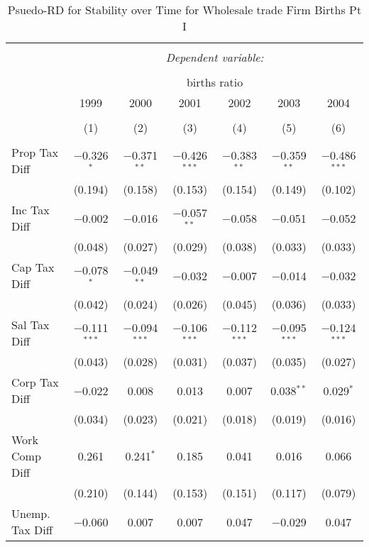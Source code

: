 
\begin{table}[!htbp] \centering 
  \caption{Psuedo-RD for Stability over Time for  Wholesale trade Firm Births Pt I} 
  \label{42year} 
\small 
\begin{tabular}{@{\extracolsep{5pt}}lcccccc} 
\\[-1.8ex]\hline 
\hline \\[-1.8ex] 
 & \multicolumn{6}{c}{\textit{Dependent variable:}} \\ 
\cline{2-7} 
\\[-1.8ex] & \multicolumn{6}{c}{births ratio} \\ 
 & 1999 & 2000 & 2001 & 2002 & 2003 & 2004 \\ 
\\[-1.8ex] & (1) & (2) & (3) & (4) & (5) & (6)\\ 
\hline \\[-1.8ex] 
 Prop Tax Diff & $-$0.326$^{*}$ & $-$0.371$^{**}$ & $-$0.426$^{***}$ & $-$0.383$^{**}$ & $-$0.359$^{**}$ & $-$0.486$^{***}$ \\ 
  & (0.194) & (0.158) & (0.153) & (0.154) & (0.149) & (0.102) \\ 
  Inc Tax Diff & $-$0.002 & $-$0.016 & $-$0.057$^{**}$ & $-$0.058 & $-$0.051 & $-$0.052 \\ 
  & (0.048) & (0.027) & (0.029) & (0.038) & (0.033) & (0.033) \\ 
  Cap Tax Diff & $-$0.078$^{*}$ & $-$0.049$^{**}$ & $-$0.032 & $-$0.007 & $-$0.014 & $-$0.032 \\ 
  & (0.042) & (0.024) & (0.026) & (0.045) & (0.036) & (0.033) \\ 
  Sal Tax Diff & $-$0.111$^{***}$ & $-$0.094$^{***}$ & $-$0.106$^{***}$ & $-$0.112$^{***}$ & $-$0.095$^{***}$ & $-$0.124$^{***}$ \\ 
  & (0.043) & (0.028) & (0.031) & (0.037) & (0.035) & (0.027) \\ 
  Corp Tax Diff & $-$0.022 & 0.008 & 0.013 & 0.007 & 0.038$^{**}$ & 0.029$^{*}$ \\ 
  & (0.034) & (0.023) & (0.021) & (0.018) & (0.019) & (0.016) \\ 
  Work Comp Diff & 0.261 & 0.241$^{*}$ & 0.185 & 0.041 & 0.016 & 0.066 \\ 
  & (0.210) & (0.144) & (0.153) & (0.151) & (0.117) & (0.079) \\ 
  Unemp. Tax Diff & $-$0.060 & 0.007 & 0.007 & 0.047 & $-$0.029 & 0.047 \\ 

\end{tabular}
\end{table}
